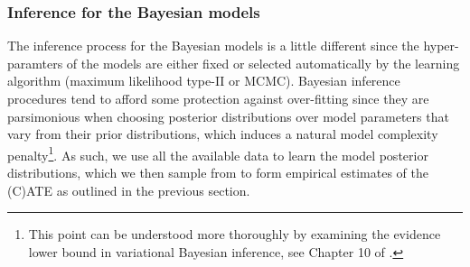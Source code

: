 \documentclass[12pt, a4paper]{article}
\begin{document}
%


\subsubsection*{Inference for the Bayesian models}

The inference process for the Bayesian models is a little different since the
hyper-paramters of the models are either fixed or selected automatically by the
learning algorithm (maximum likelihood type-II or MCMC). Bayesian inference
procedures tend to afford some protection against over-fitting since they are
parsimonious when choosing posterior distributions over model parameters that
vary from their prior distributions, which induces a natural model complexity
penalty\footnote{This point can be understood more thoroughly by examining the
evidence lower bound in variational Bayesian inference, see Chapter 10 of
\citet{bishop2006}.}. As such, we use all the available data to learn the model
posterior distributions, which we then sample from to form empirical estimates
of the (C)ATE as outlined in the previous section. 
\end{document}
